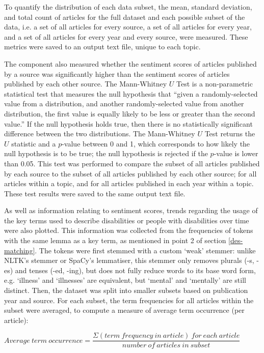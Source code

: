 \documentclass{report}
\begin{document}
To quantify the distribution of each data subset, the mean, standard deviation, and total count of articles for the full dataset and each possible subset of the data, i.e. a set of all articles for every source, a set of all articles for every year, and a set of all articles for every year and every source, were measured. 
These metrics were saved to an output text file, unique to each topic.

The component also measured whether the sentiment scores of articles published by a source was significantly higher than the sentiment scores of articles published by each other source. 
The Mann-Whitney $U$ Test \cite{mann1947test} is a non-parametric statistical test that measures the null hypothesis that ``given a randomly-selected value from a distribution, and another randomly-selected value from another distribution, the first value is equally likely to be less or greater than the second value.''
If the null hypothesis holds true, then there is no statistically significant difference between the two distributions.
The Mann-Whitney $U$ Test returns the $U$ statistic and a $p$-value between 0 and 1, which corresponds to how likely the null hypothesis is to be true; the null hypothesis is rejected if the $p$-value is lower than 0.05.
This test was performed to compare the subset of all articles published by each source to the subset of all articles published by each other source; for all articles within a topic, and for all articles published in each year within a topic.
These test results were saved to the same output text file.

As well as information relating to sentiment scores, trends regarding the usage of the key terms used to describe disabilities or people with disabilities over time were also plotted.
This information was collected from the frequencies of tokens with the same lemma as a key term, as mentioned in point 2 of section \ref{des-matching}.
The tokens were first stemmed with a custom `weak' stemmer: unlike NLTK's stemmer or SpaCy's lemmatiser, this stemmer only removes plurals (-s, -es) and tenses (-ed, -ing), but does not fully reduce words to its base word form, e.g. `illness' and `illnesses' are equivalent, but `mental' and `mentally' are still distinct.
Then, the dataset was split into smaller subsets based on publication year and source.
For each subset, the term frequencies for all articles within the subset were averaged, to compute a measure of average term occurrence (per article):

\begin{center}
	$Average \ term \ occurrence = \dfrac{\Sigma (term \ frequency \ in \ article) \ for \ each \ article}{number \ of \ articles \ in \ subset}$
\end{center}
\end{document}
